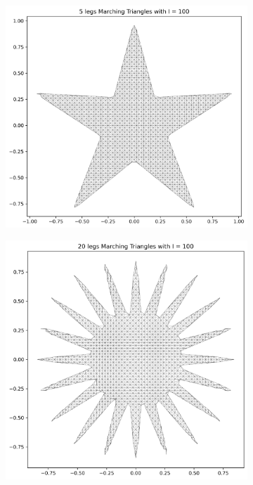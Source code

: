 \documentclass[acmtog]{acmart}
\begin{document}
\begin{figure}[H]
  \begin{subfigure}{0.22\textwidth}
    \centering
    \includegraphics[width=\textwidth]{Images/5 legs Marching Triangles with I = 100.png}
  \end{subfigure}\hfill
  \begin{subfigure}{0.22\textwidth}
    \centering
    \includegraphics[width=\textwidth]{Images/20 legs Marching Triangles with I = 100.png}

\end{subfigure}
\end{figure}
\end{document}
